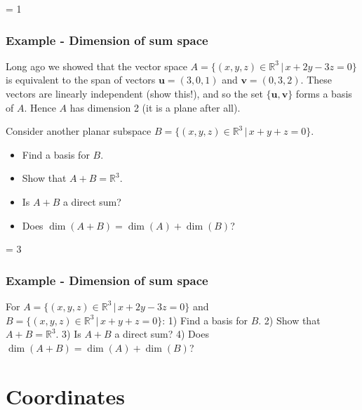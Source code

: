 \documentclass[usenames,dvipsnames,aspectratio=169,10pt]{beamer}
\def \EXAMPLEVERSION {3} %
\numberwithin{equation}{section}
\begin{document}
\ifnum \EXAMPLEVERSION = 1
\begin{frame}
\frametitle{Example - Dimension of sum space}

Long ago we showed that the vector space $A=\{(x,y,z)\in\mathbb{R}^3 \, | \, x+2y-3z=0\}$ is equivalent to the span of vectors $\mathbf{u}=(3,0,1)$ and $\mathbf{v}=(0,3,2)$. These vectors are linearly independent (show this!), and so the set $\{\mathbf{u},\mathbf{v}\}$ forms a basis of $A$. Hence $A$ has dimension 2 (it is a plane after all).

Consider another planar subspace $B=\{(x,y,z)\in\mathbb{R}^3 \, | \, x+y+z=0\}$.

\begin{itemize}
\item Find a basis for $B$.
\item Show that $A+B = \mathbb{R}^3$.
\item Is $A+B$ a direct sum?
\item Does $\dim(A+B)=\dim(A)+\dim(B)$?
\end{itemize}

\end{frame}
\fi 





\ifnum \EXAMPLEVERSION = 3
\begin{frame}
\frametitle{Example - Dimension of sum space}

For $A=\{(x,y,z)\in\mathbb{R}^3 \, | \, x+2y-3z=0\}$ and $B=\{(x,y,z)\in\mathbb{R}^3 \, | \, x+y+z=0\}$: 1) Find a basis for $B$. 2) Show that $A+B = \mathbb{R}^3$. 3) Is $A+B$ a direct sum? 4) Does $\dim(A+B)=\dim(A)+\dim(B)$?

\vspace{4.5cm}
\end{frame}

\begin{frame}

\end{frame}
\fi 




\section{Coordinates}
\end{document}
